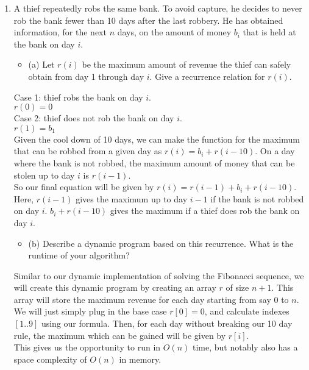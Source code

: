 \documentclass{article}
\begin{document}
\begin{enumerate}
\newpage
\item A thief repeatedly robs the same bank. To avoid capture, he decides to never rob the bank fewer than 10 days after the last robbery. He has obtained information, for the next $n$ days, on the amount of money $b_i$ that is held at the bank on day $i$.
\begin{itemize}
    \item (a) Let $r(i)$ be the maximum amount of revenue the thief can safely obtain from day 1 through day $i$. Give a recurrence relation for $r(i)$.
\end{itemize}
Case 1: thief robs the bank on day $i$. \\
$r(0) = 0$ \\
\newline
Case 2: thief does not rob the bank on day $i$. \\
$r(1) = b_{1}$ \\
\newline 
Given the cool down of 10 days, we can make the function for the maximum that can be robbed from a given day as $r(i) = b_{i} + r(i-10)$. On a day where the bank is not robbed, the maximum amount of money that can be stolen up to day $i$ is $r(i-1)$. \\
\newline 
So our final equation will be given by $r(i) = r(i-1) + b_i + r(i-10)$. Here, $r(i-1)$ gives the maximum up to day $i-1$ if the bank is not robbed on day $i$. $b_i + r(i-10)$ gives the maximum if a thief does rob the bank on day $i$.








\begin{itemize}
    \item (b) Describe a dynamic program based on this recurrence. What is the runtime of your algorithm?
\end{itemize}
Similar to our dynamic implementation of solving the Fibonacci sequence, we will create this dynamic program by creating an array $r$ of size $n+1$. This array will store the maximum revenue for each day starting from say $0$ to $n$. \\
\newline 
We will just simply plug in the base case $r[0] = 0$, and calculate indexes $[1..9]$ using our formula. Then, for each day without breaking our 10 day rule, the maximum which can be gained will be given by $r[i]$. \\
\newline 
This gives us the opportunity to run in $O(n)$ time, but notably also has a space complexity of $O(n)$ in memory.




    
\end{enumerate}
\end{document}
